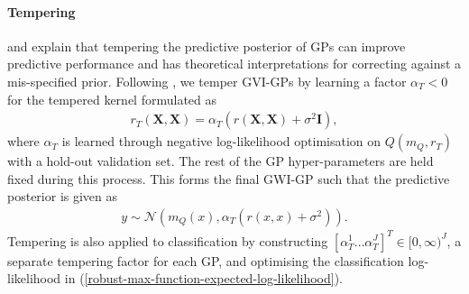 \documentclass{article}
\numberwithin{equation}{section}
\begin{document}
\paragraph{Tempering}\cite{wild2022generalized} and \cite{adlam2020cold} explain that tempering the predictive posterior of GPs can improve predictive performance and has theoretical interpretations for correcting against a mis-specified prior. Following \cite{wild2022generalized}, we temper GVI-GPs by learning a factor $\alpha_T < 0$ for the tempered kernel formulated as
\begin{align}
    r_T(\mathbf{X}, \mathbf{X}) = \alpha_T \left(r(\mathbf{X}, \mathbf{X})+\sigma^2 \mathbf{I}\right),
\end{align}
where $\alpha_T$ is learned through negative log-likelihood optimisation on $Q\left(m_Q, r_T\right)$ with a hold-out validation set. 
The rest of the GP hyper-parameters are held fixed during this process. 
This forms the final GWI-GP such that the predictive posterior is given as
\begin{align}
    y \sim \mathcal{N}\left(m_Q(x), \alpha_T \left( r(x, x) + \sigma^2\right) \right).
\end{align}
Tempering is also applied to classification by constructing $\left[\alpha_T^1 \dots \alpha_T^J\right]^T \in [0, \infty)^J$, a separate tempering factor for each GP, and optimising the classification log-likelihood in (\ref{robust-max-function-expected-log-likelihood}).
\end{document}
